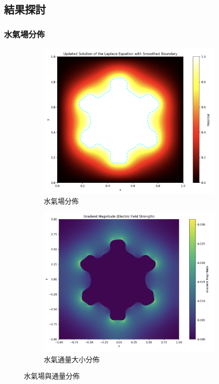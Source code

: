 \documentclass[12pt, a4paper]{article}
\theoremstyle{mystyle}	%
\begin{document}
\subsection{結果探討}
\subsubsection{水氣場分佈}
\begin{figure}[H]
\centering
\begin{subfigure}{.5\textwidth}
    \centering
    \includegraphics[height=.8\linewidth]{potential.png}
    \caption{水氣場分佈}
    \label{pot}
\end{subfigure}%
\begin{subfigure}{.5\textwidth}
    \centering
    \includegraphics[height=.8\linewidth]{gradient.png}
    \caption{水氣通量大小分佈}
    \label{grad}
    \end{subfigure}
    \caption{水氣場與通量分佈}
    \label{pog}
\end{figure}
\end{document}
